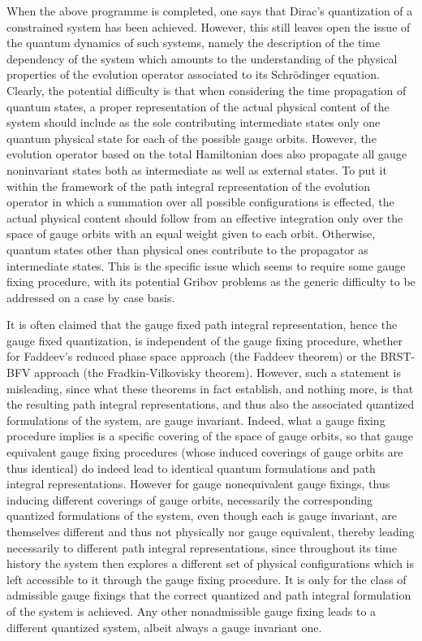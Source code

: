 \documentclass[a4paper,11pt]{article}
\begin{document}
When the above programme is completed, one says that Dirac's quantization
of a constrained system has been achieved. However, this still leaves
open the issue of the quantum dynamics of such systems, namely the
description of the time dependency of the system which amounts to the
understanding of the physical properties of the evolution operator
associated to its Schr\"odinger equation. Clearly, the potential
difficulty is that when considering the time propagation of quantum
states, a proper representation of the actual physical content of
the system should include as the sole contributing intermediate states 
only one quantum physical state for each of the possible gauge orbits. 
However, the evolution operator based on the total Hamiltonian \coordHE{} 
does also propagate all gauge noninvariant states both as intermediate as 
well as external states. To put it within the framework of the path integral 
representation of the evolution operator in which a summation over
all possible configurations is effected, the actual physical content
should follow from an effective integration only over the space of
gauge orbits with an equal weight given to each orbit. Otherwise,
quantum states other than physical ones contribute to the propagator
as intermediate states. This is the specific issue which seems to require
some gauge fixing procedure, with its potential Gribov problems as
the generic difficulty to be addressed on a case by case basis.

It is often claimed that the gauge fixed path integral representation,
hence the gauge fixed quantization, is independent of the gauge fixing
procedure, whether for Faddeev's reduced phase space approach (the Faddeev
theorem\cite{JG1,Fad}) or the BRST-BFV approach (the Fradkin-Vilkovisky 
theorem\cite{JG1,BFV1}). However, such a statement is 
misleading,\cite{JG1,JG4,JG5} since what these theorems in
fact establish, and nothing more, is that the resulting path integral 
representations, and thus also the associated quantized formulations of 
the system, are gauge invariant. Indeed, what a gauge fixing procedure 
implies is a specific covering of the space of gauge orbits, 
so that gauge equi\-va\-lent gauge fixing procedures (whose induced coverings 
of gauge orbits are thus identical) do indeed lead to identical quantum 
formulations and path integral representations. However for gauge 
nonequivalent gauge fixings, thus inducing different coverings of gauge 
orbits, necessarily the corresponding quantized formulations of the system, 
even though each is gauge invariant, are themselves different and thus not 
physically nor gauge equivalent, thereby leading necessarily to different 
path integral representations, since throughout its time history the system
then explores a different set of physical configurations which is left
accessible to it through the gauge fixing procedure. It is only for the 
class of admissible gauge fixings that the correct quantized and path 
integral formulation of the system is achieved. Any other nonadmissible 
gauge fixing leads to a different quantized system, albeit always a gauge 
invariant one.
\end{document}
